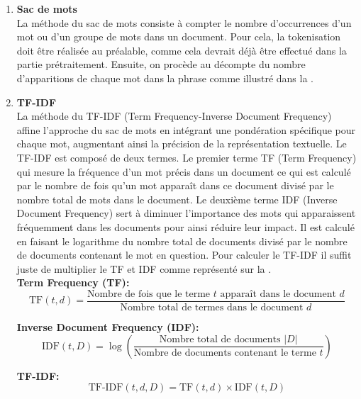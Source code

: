 \documentclass{rapport}
\begin{document}
\begin{enumerate}[listparindent=0pt, parsep=0pt]

    \item \textbf{Sac de mots}\\
    La méthode du sac de mots consiste à compter le nombre d'occurrences d'un mot ou d'un groupe de mots dans un document. Pour cela, la tokenisation doit être réalisée au préalable, comme cela devrait déjà être effectué dans la partie prétraitement. Ensuite, on procède au décompte du nombre d'apparitions de chaque mot dans la phrase comme illustré dans la .

    \newpage
    \item \textbf{TF-IDF}\\
    La méthode du TF-IDF (Term Frequency-Inverse Document Frequency) affine l'approche du sac de mots en intégrant une pondération spécifique pour chaque mot, augmentant ainsi la précision de la représentation textuelle. Le TF-IDF est composé de deux termes. Le premier terme TF (Term Frequency) qui mesure la fréquence d'un mot précis dans un document ce qui est calculé par le nombre de fois qu'un mot apparaît dans ce document divisé par le nombre total de mots dans le document. Le deuxième terme IDF (Inverse Document Frequency) sert à diminuer l'importance des mots qui apparaissent fréquemment dans les documents pour ainsi réduire leur impact. Il est calculé en faisant le logarithme du nombre total de documents divisé par le nombre de documents contenant le mot en question. Pour calculer le TF-IDF il suffit juste de multiplier le TF et IDF comme représenté sur la .\\
    
    \textbf{Term Frequency (TF):}
    \begin{equation}
    \text{TF}(t, d) = \frac{\text{Nombre de fois que le terme } t \text{ apparaît dans le document } d}{\text{Nombre total de termes dans le document } d}
    \end{equation}
    
    \textbf{Inverse Document Frequency (IDF):}
    \begin{equation}
    \text{IDF}(t, D) = \log \left(\frac{\text{Nombre total de documents } |D|}{\text{Nombre de documents contenant le terme } t} \right)
    \end{equation}
    
    \textbf{TF-IDF:}
    \begin{equation}
    \text{TF-IDF}(t, d, D) = \text{TF}(t, d) \times \text{IDF}(t, D)
    \end{equation}


\end{enumerate}
\end{document}
